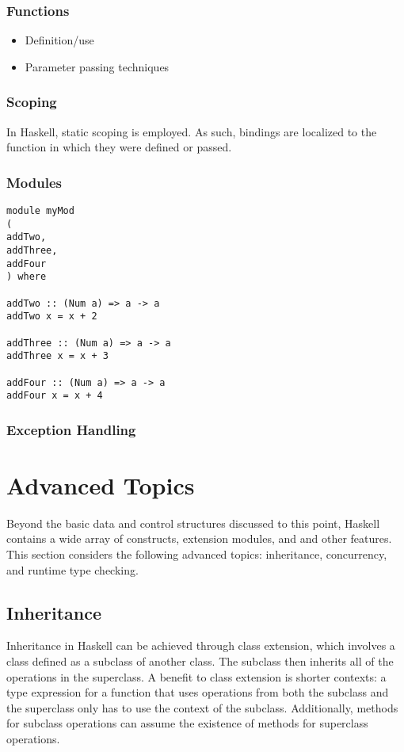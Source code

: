 \documentclass[titlepage,12pt]{article}
\newcommand{\bi}{\begin{itemize}}
\newcommand{\ei}{\end{itemize}}
\begin{document}
\subsubsection{Functions}
\bi
    \item Definition/use
    \item Parameter passing techniques
\ei

\subsubsection{Scoping}
In Haskell, static scoping is employed.  As such, bindings are localized
to the function in which they were defined or passed.

\subsubsection{Modules}
\begin{verbatim}
module myMod 
( 
addTwo,
addThree,
addFour
) where

addTwo :: (Num a) => a -> a
addTwo x = x + 2

addThree :: (Num a) => a -> a
addThree x = x + 3

addFour :: (Num a) => a -> a
addFour x = x + 4
\end{verbatim}
\subsubsection{Exception Handling}



\section{Advanced Topics}
Beyond the basic data and control structures discussed to this point,
Haskell contains a wide array of constructs, extension modules, and
and other features.  This section considers the following advanced
topics: inheritance, concurrency, and runtime type checking.

\subsection{Inheritance}

Inheritance in Haskell can be achieved through class extension, which involves a class defined as a subclass 
of another class. The subclass then inherits all of the operations in the superclass. A benefit to class 
extension is shorter contexts: a type expression for a function that uses operations from both the subclass 
and the superclass only has to use the context of the subclass. Additionally, methods for subclass 
operations can assume the existence of methods for superclass operations.
\end{document}
